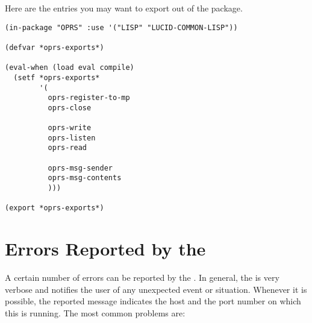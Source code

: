 Here are the entries you may want to export out of the 
package.

\begin{verbatim}
(in-package "OPRS" :use '("LISP" "LUCID-COMMON-LISP"))

(defvar *oprs-exports*)

(eval-when (load eval compile)
  (setf *oprs-exports*
        '(
          oprs-register-to-mp
          oprs-close

          oprs-write
          oprs-listen
          oprs-read

          oprs-msg-sender
          oprs-msg-contents
          )))

(export *oprs-exports*)
\end{verbatim}

\section{Errors Reported by the \MPA{}}

A certain number of errors can be reported by the \MPA{}. In
general, the \MPA{} is very verbose and notifies the user of
any unexpected event or situation. Whenever it is possible, the reported
message  indicates the host and the port number on which this \MPA{} is
running. The most common problems are: 

